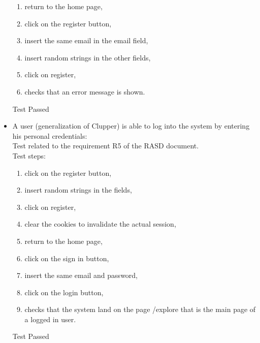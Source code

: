\begin{itemize}
\begin{enumerate}
        \item return to the home page,

        \item click on the register button,

        \item insert the same email in the email field,

        \item insert random strings in the other fields,

        \item click on register,

        \item checks that an error message is shown.
    \end{enumerate}
    Test Passed \\

    \item A user (generalization of Clupper) is able to log into the system by entering his personal credentials: \\
    Test related to the requirement R5 of the RASD document. \\
    Test steps: \\
    \begin{enumerate}

        \item click on the register button,

        \item insert random strings in the fields,

        \item click on register,

        \item clear the cookies to invalidate the actual session,

        \item return to the home page,

        \item click on the sign in button,

        \item insert the same email and password,

        \item click on the login button,
        \item checks that the system land on the page /explore that is the main page of a logged in user.
    \end{enumerate}
    Test Passed

\end{itemize}
